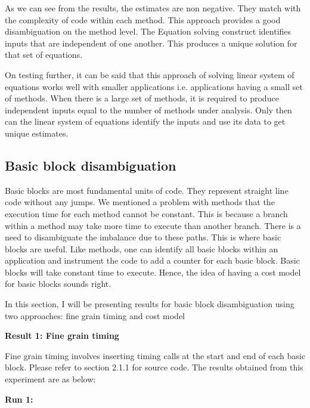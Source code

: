 \documentclass[11pt]{article}
\begin{document}
As we can see from the results, the estimates are non negative. They match with the complexity of code within each method. This approach provides a good disambiguation on the method level. The Equation solving construct identifies inputs that are independent of one another. This produces a unique solution for that set of equations.

On testing further, it can be said that this approach of solving linear system of equations works well with smaller applications i.e. applications having a small set of methods. When there is a large set of methods, it is required to produce independent inputs equal to the number of methods under analysis. Only then can the linear system of equations identify the inputs and use its data to get unique estimates.
\newpage

\subsection{Basic block disambiguation}
Basic blocks are most fundamental units of code. They represent straight line code without any jumps. We mentioned a problem with methods that the execution time for each method cannot be constant. This is because a branch within a method may take more time to execute than another branch. There is a need to disambiguate the imbalance due to these paths. This is where basic blocks are useful. Like methods, one can identify all basic blocks within an application and instrument the code to add a counter for each basic block. Basic blocks will take constant time to execute. Hence, the idea of having a cost model for basic blocks sounds right.

In this section, I will be presenting results for basic block disambiguation using two approaches: fine grain timing and cost model

\textbf{Result 1: Fine grain timing}

Fine grain timing involves inserting timing calls at the start and end of each basic block. Please refer to section 2.1.1 for source code. The results obtained from this experiment are as below:

\textbf{Run 1:}
\end{document}
